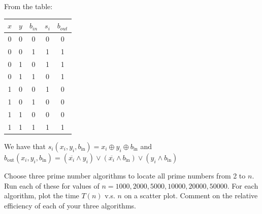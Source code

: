 \documentclass[11pt,twoside,openany]{memoir}
\begin{document}
        \begin{solution}
            From the table:
            \begin{center}
                \begin{tabular}{c c c | c c}
                    \hline
                    $x$ & $y$ & $b_{in}$ & $s_i$ & $b_{out}$ \\
                    \hline
                    0 & 0 & 0 & 0 & 0 \\
                    0 & 0 & 1 & 1 & 1 \\
                    0 & 1 & 0 & 1 & 1 \\
                    0 & 1 & 1 & 0 & 1 \\
                    1 & 0 & 0 & 1 & 0 \\
                    1 & 0 & 1 & 0 & 0 \\
                    1 & 1 & 0 & 0 & 0 \\
                    1 & 1 & 1 & 1 & 1 \\
                    \hline
                    \end{tabular}
            \end{center}
            We have that $s_i (x_i, y_i, b_{\text{in}}) = x_i \oplus y_i \oplus b_{\text{in}}$ and $b_\text{out}(x_i,y_i,b_\text{in}) = (\overline {x_i} \land y_i) \lor (\overline{x_i} \land b_\text{in}) \lor (y_i \land b_\text{in})$
        \end{solution}
    \begin{problem}
        Choose three prime number algorithms to locate all prime numbers from 2 to $n$. Run each of these for values of $n = 1000,2000,5000,10000,20000,50000$. For each algorithm, plot the time $T(n)$ v.s. $n$ on a scatter plot. Comment on the relative efficiency of each of your three algorithms.
    \end{problem}
\end{document}
